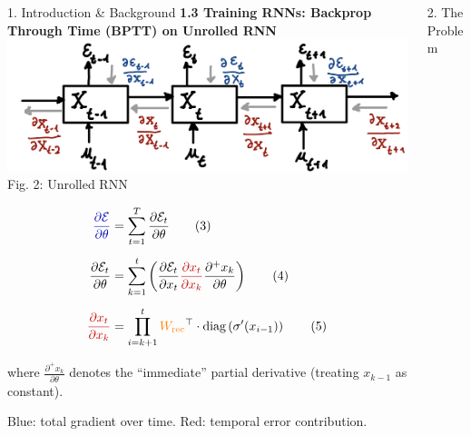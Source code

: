 \documentclass[final]{beamer}
\begin{document}
\begin{frame}[t]
\begin{columns}[t,totalwidth=\textwidth]
\begin{column}{0.33\textwidth}
\begin{block}{1. Introduction \& Background}
        \vspace{1em}
        \textbf{1.3 Training RNNs: Backprop Through Time (BPTT) on Unrolled RNN}\\
        \includegraphics[width=0.95\linewidth]{figures/2_fig.png}\\[0.5em]
        Fig. 2: Unrolled RNN

        \vspace{0.3em}
        \begin{align*}
          \textcolor{myblue}{\frac{\partial \mathcal{E}}{\partial \theta}} &=
          \sum_{t=1}^{T} \frac{\partial \mathcal{E}_t}{\partial \theta} \hspace{2em} \text{(3)} \\[0.5em]
          \frac{\partial \mathcal{E}_t}{\partial \theta} &=
          \sum_{k=1}^{t} 
          \left( {\frac{\partial \mathcal{E}_t}{\partial x_t}} 
          \textcolor{myred}{\frac{\partial x_t}{\partial x_k}}
          \frac{\partial^+ x_k}{\partial \theta} \right) \hspace{2em} \text{(4)} \\[0.5em]
          \textcolor{myred}{\frac{\partial x_t}{\partial x_k}} &=
          \prod_{i=k+1}^{t}
          \textcolor{orange}{W_{\text{rec}}}^\top \cdot \text{diag}\left(\sigma'(x_{i-1})\right) \hspace{2em} \text{(5)}
        \end{align*}
        
        \vspace{0.5em}
        where $\frac{\partial^+ x_k}{\partial \theta}$ denotes the “immediate” partial derivative (treating $x_{k-1}$ as constant).
        
        \vspace{0.5em}
        \textcolor{myblue}{Blue}: total gradient over time.
        \quad
        \textcolor{myred}{Red}: temporal error contribution.

      \end{block}
    \end{column}

\begin{column}{0.33\textwidth}
    \begin{block}{2. The Problem}


\end{block}
\end{column}
\end{columns}
\end{frame}
\end{document}
